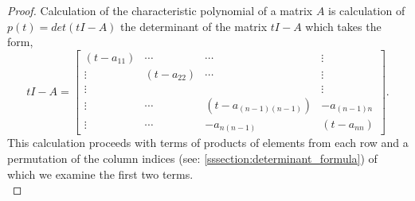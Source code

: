\documentclass[MathsNotesBase.tex]{subfiles}
\begin{document}
{		\bigskip
		\begin{proof}
			Calculation of the characteristic polynomial of a matrix $A$ is calculation of ${ p(t) = det(tI - A) }$ the determinant of the matrix ${ tI - A }$ which takes the form,
			\[
				tI - A = \begin{bmatrix}
						(t - a_{11}) & \cdots & \cdots 			   & \vdots\\
						\vdots & (t - a_{22}) & \cdots 			   & \vdots\\
						\vdots &   			&  					   & \vdots\\
						\vdots & \cdots 	& (t - a_{(n-1)(n-1)}) & -a_{(n-1)n}\\
						\vdots & \cdots 	& -a_{n(n-1)} 		   & (t - a_{nn})
						\end{bmatrix}.
			\]
			This calculation proceeds with terms of products of elements from each row and a permutation of the column indices (see: \ref{sssection:determinant_formula}) of which we examine the first two terms.\\
			

\end{proof}}
\end{document}
